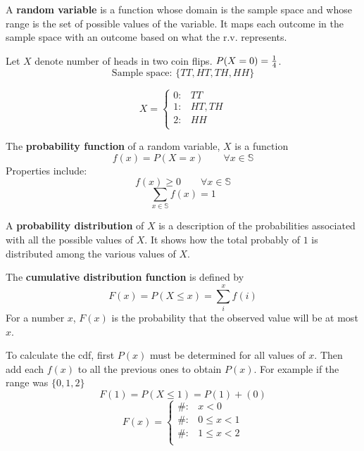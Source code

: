 \documentclass[english, 12pt]{article}
\begin{document}
\begin{defn}
A \textbf{random variable} is a function whose domain is the sample space and whose range is the set of possible values of the variable. It maps each outcome in the sample space with an outcome based on what the r.v. represents.

\begin{exmp}Let $X$ denote number of heads in two coin flips. $P(X = 0) = \frac{1}{4}$.
\[\text{Sample space: } \{TT,HT,TH,HH\}\]

\begin{displaymath}
   X = \left\{
     \begin{array}{lr}
       0 : &TT \\
       1 : &HT,TH\\
       2 : &HH\\
     \end{array}
   \right.
\end{displaymath}
\end{exmp}
\end{defn}

\begin{defn}
The \textbf{probability function} of a random variable, $X$ is a function
\[f(x) = P(X=x)\qquad \forall x \in \mathbb{S}\]
Properties include:
\[f(x) \geq 0 \qquad \forall x \in \mathbb{S}\]
\[\sum_{x \in \mathbb{S}} f(x) = 1\]
\end{defn}

\begin{defn}
A \textbf{probability distribution} of $X$ is a description of the probabilities associated with all the possible values of $X$. It shows how the total probably of $1$ is distributed among the various values of $X$.
\end{defn}

\begin{defn}
The \textbf{cumulative distribution function} is defined by
\[F(x) = P(X \leq x) = \sum_i^x f(i)\]
For a number $x$, $F(x)$ is the probability that the observed value will be at most $x$.
\end{defn}

\begin{mthd}
To calculate the cdf, first $P(x)$ must be determined for all values of $x$. Then add each $f(x)$ to all the previous ones to obtain $P(x)$. For example if the range was $\{0,1,2\}$
\[ F(1) = P(X \leq 1) = P(1) + (0)\]
\begin{displaymath}
   F(x) = \left\{
     \begin{array}{lr}
       \# : & x < 0 \\
       \# : & 0 \leq x < 1\\
       \# : &1 \leq x < 2\\
     \end{array}
   \right.
\end{displaymath}
\end{mthd}
\end{document}
